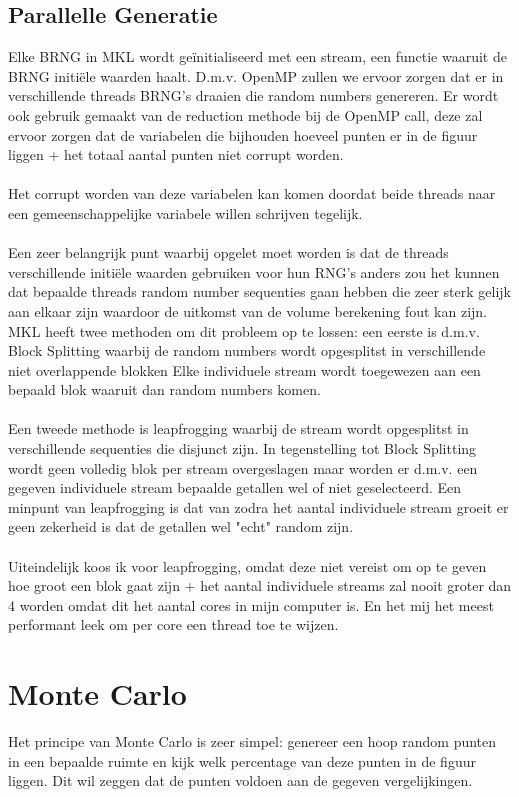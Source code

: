 \documentclass[10pt,a4paper,twocolumn]{article}
\begin{document}
\subsection{Parallelle Generatie}
Elke BRNG in MKL wordt geïnitialiseerd met een stream, een functie waaruit de BRNG initiële waarden haalt. D.m.v. OpenMP zullen we ervoor zorgen dat er in verschillende threads BRNG's draaien die random numbers genereren. Er wordt ook gebruik gemaakt van de reduction methode bij de OpenMP call, deze zal ervoor zorgen dat de variabelen die bijhouden hoeveel punten er in de figuur liggen + het totaal aantal punten niet corrupt worden.
\\
\\
Het corrupt worden van deze variabelen kan komen doordat beide threads naar een gemeenschappelijke variabele willen schrijven tegelijk. 
\\
\\
Een zeer belangrijk punt waarbij opgelet moet worden is dat de threads verschillende initiële waarden gebruiken voor hun RNG's anders zou het kunnen dat bepaalde threads random number sequenties gaan hebben die zeer sterk gelijk aan elkaar zijn waardoor de uitkomst van de volume berekening fout kan zijn. MKL heeft twee methoden om dit probleem op te lossen: een eerste is d.m.v. Block Splitting waarbij de random numbers wordt opgesplitst in verschillende niet overlappende blokken Elke individuele stream wordt toegewezen aan een bepaald blok waaruit dan random numbers komen.
\\
\\
Een tweede methode is leapfrogging waarbij de stream wordt opgesplitst in verschillende sequenties die disjunct zijn. In tegenstelling tot Block Splitting wordt geen volledig blok per stream overgeslagen maar worden er d.m.v. een gegeven individuele stream bepaalde getallen wel of niet geselecteerd. Een minpunt van leapfrogging is dat van zodra het aantal individuele stream groeit er geen zekerheid is dat de getallen wel "echt" random zijn.
 \\
 \\
Uiteindelijk koos ik voor leapfrogging, omdat deze niet vereist om op te geven hoe groot een blok gaat zijn + het aantal individuele streams zal nooit groter dan 4 worden omdat dit het aantal cores in mijn computer is. En het mij het meest performant leek om per core een thread toe te wijzen.
\section{Monte Carlo}
Het principe van Monte Carlo is zeer simpel: genereer een hoop random punten in een bepaalde ruimte en kijk welk percentage van deze punten in de figuur liggen. Dit wil zeggen dat de punten voldoen aan de  gegeven vergelijkingen.
\end{document}
